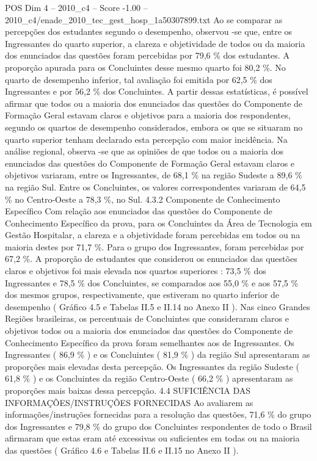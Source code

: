 \begin{textsample}{POS Dim 4 – 2010\_c4 – Score -1.00 – 2010\_c4/enade\_2010\_tec\_gest\_hosp\_1a50307899.txt}
Ao se comparar as percepções dos estudantes segundo o desempenho, observou -se que, entre os Ingressantes do quarto superior, a clareza e objetividade de todos ou da maioria dos enunciados das questões foram percebidas por 79,6 \% dos estudantes.
A proporção apurada para os Concluintes desse mesmo quarto foi 80,2 \%.
No quarto de desempenho inferior, tal avaliação foi emitida por 62,5 \% dos Ingressantes e por 56,2 \% dos Concluintes.
A partir dessas estatísticas, é possível afirmar que todos ou a maioria dos enunciados das questões do Componente de Formação Geral estavam claros e objetivos para a maioria dos respondentes, segundo os quartos de desempenho considerados, embora os que se situaram no quarto superior tenham declarado esta percepção com maior incidência.
Na análise regional, observa -se que as opiniões de que todos ou a maioria dos enunciados das questões do Componente de Formação Geral estavam claros e objetivos variaram, entre os Ingressantes, de 68,1 \% na região Sudeste a 89,6 \% na região Sul.
Entre os Concluintes, os valores correspondentes variaram de 64,5 \% no Centro-Oeste a 78,3 \%, no Sul. 4.3.2 Componente de Conhecimento Específico Com relação aos enunciados das questões do Componente de Conhecimento Específico da prova, para os Concluintes da Área de Tecnologia em Gestão Hospitalar, a clareza e a objetividade foram percebidas em todos ou na maioria destes por 71,7 \%.
Para o grupo dos Ingressantes, foram percebidas por 67,2 \%.
A proporção de estudantes que considerou os enunciados das questões claros e objetivos foi mais elevada nos quartos superiores : 73,5 \% dos Ingressantes e 78,5 \% dos Concluintes, se comparados aos 55,0 \% e aos 57,5 \% dos mesmos grupos, respectivamente, que estiveram no quarto inferior de desempenho ( Gráfico 4.5 e Tabelas II.5 e II.14 no Anexo II ).
Nas cinco Grandes Regiões brasileiras, os percentuais de Concluintes que consideraram claros e objetivos todos ou a maioria dos enunciados das questões do Componente de Conhecimento Específico da prova foram semelhantes aos de Ingressantes.
Os Ingressantes ( 86,9 \% ) e os Concluintes ( 81,9 \% ) da região Sul apresentaram as proporções mais elevadas desta percepção.
Os Ingressantes da região Sudeste ( 61,8 \% ) e os Concluintes da região Centro-Oeste ( 66,2 \% ) apresentaram as proporções mais baixas dessa percepção. 4.4 SUFICIÊNCIA DAS INFORMAÇÕES/INSTRUÇÕES FORNECIDAS Ao avaliarem as informações/instruções fornecidas para a resolução das questões, 71,6 \% do grupo dos Ingressantes e 79,8 \% do grupo dos Concluintes respondentes de todo o Brasil afirmaram que estas eram até excessivas ou suficientes em todas ou na maioria das questões ( Gráfico 4.6 e Tabelas II.6 e II.15 no Anexo II ).

\end{textsample}
